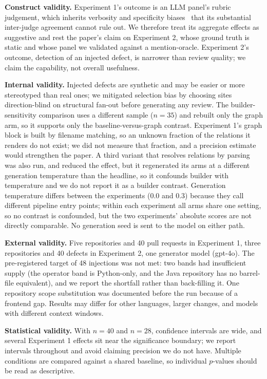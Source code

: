 \documentclass[conference]{IEEEtran}
\begin{document}
\textbf{Construct validity.} Experiment 1's outcome is an LLM panel's rubric
judgement, which inherits verbosity and specificity
biases~\cite{zheng2023judging} that its substantial inter-judge agreement
cannot rule out. We therefore treat its
aggregate effects as suggestive and rest the paper's claim on Experiment 2,
whose ground truth is static and whose panel we validated against a
mention-oracle. Experiment 2's outcome, detection of an injected defect, is
narrower than review quality; we claim the capability, not overall
usefulness.

\textbf{Internal validity.} Injected defects are synthetic and may be easier
or more stereotyped than real ones; we mitigated selection bias by choosing
sites direction-blind on structural fan-out before generating any review.
The builder-sensitivity comparison uses a different sample ($n=35$) and
rebuilt only the graph arm, so it supports only the baseline-versus-graph
contrast. Experiment 1's graph block is built by filename matching, so an
unknown fraction of the relations it renders do not exist; we did not measure
that fraction, and a precision estimate would strengthen the paper. A third
variant that resolves relations by parsing was also run, and reduced the
effect, but it regenerated its arms at a different generation temperature than
the headline, so it confounds builder with temperature and we do not report it
as a builder contrast. Generation temperature differs between the experiments ($0.0$ and
$0.3$) because they call different pipeline entry points; within each
experiment all arms share one setting, so no contrast is confounded, but the
two experiments' absolute scores are not directly comparable. No generation
seed is sent to the model on either path.

\textbf{External validity.} Five repositories and 40 pull requests in
Experiment 1, three repositories and 40 defects in Experiment 2, one
generator model (gpt-4o). The pre-registered target of 48 injections was not
met: two bands had insufficient supply (the operator band is Python-only,
and the Java repository has no barrel-file equivalent), and we report the
shortfall rather than back-filling it. One repository scope substitution was
documented before the run because of a frontend gap. Results may differ for
other languages, larger changes, and models with different context windows.

\textbf{Statistical validity.} With $n=40$ and $n=28$, confidence intervals
are wide, and several Experiment 1 effects sit near the significance
boundary; we report intervals throughout and avoid claiming precision we do
not have. Multiple conditions are compared against a shared baseline, so
individual $p$-values should be read as descriptive.
\end{document}
